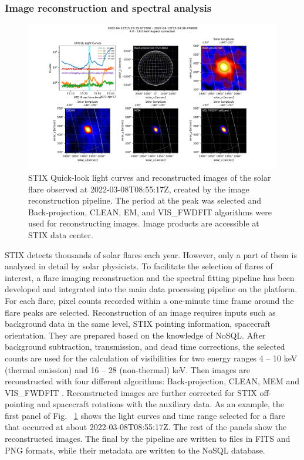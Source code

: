 \documentclass[referee]{aa} %
\begin{document}
\subsubsection{Image reconstruction and spectral analysis}
\begin{figure}
  \centering
  \includegraphics[width=0.95\linewidth]{figures/imaging_pipeline.pdf}
  \caption{ 
   STIX Quick-look light curves and reconstructed images of the solar flare observed at 2022-03-08T08:55:17Z, 
   created by the image reconstruction pipeline.  The period at the peak was selected and 
   Back-projection, CLEAN, EM, and VIS\_FWDFIT
    algorithms were used for reconstructing images. Image products are accessible
   at STIX data center.}
  \label{fig:imaging}
\end{figure}
STIX detects thousands of solar flares each year. However, only
 a part of them is analyzed in detail by solar physicists. 
To facilitate the selection of flares of interest, a flare imaging reconstruction and the spectral fitting pipeline 
has been developed and integrated into the main data processing pipeline on the platform. 
For each flare, pixel counts recorded within a one-minute time frame around the flare peaks  
are selected.
Reconstruction of an image requires inputs such as background data in the same level, 
STIX pointing information, spacecraft orientation. 
They are prepared based on the knowledge of NoSQL. 
After background subtraction, transmission, and dead time corrections, the selected counts are used for 
the calculation of visibilities for two energy ranges 4 -- 10 keV (thermal emission) and 16 -- 28 (non-thermal)  
keV.
Then images are reconstructed with four different algorithms: Back-projection, CLEAN, 
MEM and VIS\_FWDFIT \cite{paolo2020,clean, mem}.
Reconstructed images are further corrected for STIX off-pointing and spacecraft rotations with the auxiliary data. 
As an example,  the first panel of Fig. ~\ref{fig:imaging} shows 
the light curves and time range selected for a flare that occurred at about 2022-03-08T08:55:17Z.
The rest of the panels show the reconstructed images. 
The final by the pipeline are written to files in FITS  and PNG formats, while
their metadata are written to the NoSQL database.  
\end{document}
